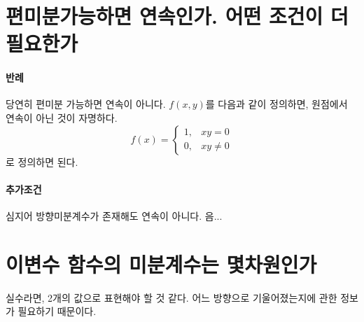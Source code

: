 \section{편미분가능하면 연속인가. 어떤 조건이 더 필요한가}

\paragraph{반례}
당연히 편미분 가능하면 연속이 아니다. $f(x,y)$를 다음과 같이 정의하면, 원점에서 연속이 아닌 것이 자명하다.
$$f(x) = \begin{cases}
    1, & xy=0 \\
    0, & xy \ne 0
\end{cases}
$$로 정의하면 된다.

\paragraph{추가조건}
심지어 방향미분계수가 존재해도 연속이 아니다. 음...

\section{이변수 함수의 미분계수는 몇차원인가}
실수라면, 2개의 값으로 표현해야 할 것 같다. 어느 방향으로 기울어졌는지에 관한 정보가 필요하기 때문이다. 